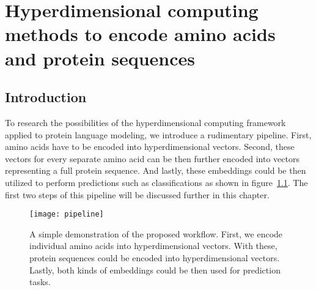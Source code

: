 \chapter[Amino acid and protein encoding]{Hyperdimensional computing methods to encode amino acids and protein sequences}
\section{Introduction}
To research the possibilities of the hyperdimensional computing framework applied to protein language modeling, we introduce a rudimentary pipeline. First, amino acids have to be encoded into hyperdimensional vectors. Second, these vectors for every separate amino acid can be then further encoded into vectors representing a full protein sequence. And lastly, these embeddings could be then utilized to perform predictions such as classifications as shown in figure~\ref{fig:pipeline}. The first two steps of this pipeline will be discussed further in this chapter.

\begin{figure}[H]
    \centering
    \texttt{[image: pipeline]}
    \caption{A simple demonstration of the proposed workflow. First, we encode individual amino acids into hyperdimensional vectors. With these, protein sequences could be encoded into hyperdimensional vectors. Lastly, both kinds of embeddings could be then used for prediction tasks.}\label{fig:pipeline}
\end{figure}

